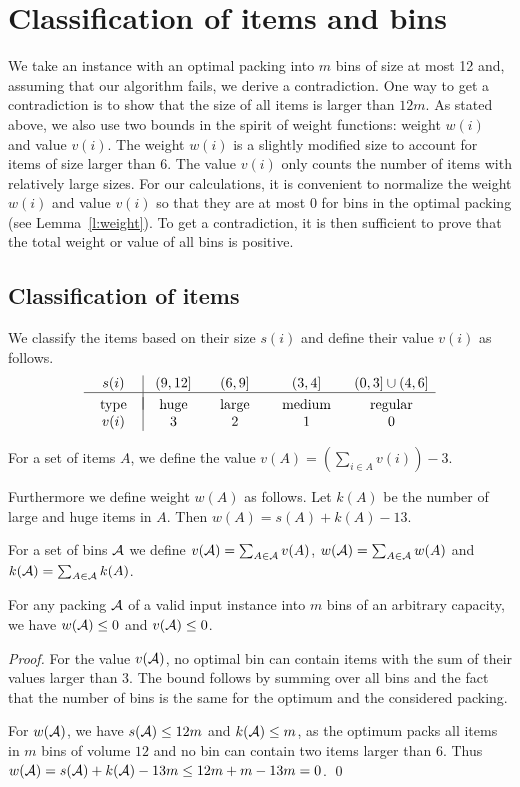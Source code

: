 \section{Classification of items and bins}

We take an instance with an optimal packing into $m$ bins of size at
most 12 and, assuming that our algorithm fails, we derive a
contradiction. One way to get a contradiction is to show that the size
of all items is larger than $12m$. As stated above, 
we also use two bounds in the
spirit of weight functions: weight $w(i)$ and value $v(i)$. The weight
$w(i)$ is a slightly modified size to account for items of size larger
than 6. The value $v(i)$ only counts the number of items with
relatively large sizes. For our calculations, it is convenient to
normalize the weight $w(i)$ and value $v(i)$ so that they are at most
0 for bins in the optimal packing (see Lemma~\ref{l:weight}). To get a contradiction, it is then sufficient to prove that
the total weight or value of all bins is positive.

\subsection{Classification of items}

We classify the items based on their size $s(i)$ and define their
value $v(i)$ as follows.  
$$
\begin{array}{c|cccc}
s(i) & (9,12] &(6,9] &(3,4] &(0,3]\cup(4,6]\\
\hline\\[-0.9em]
\mbox{~~type~~} & \mbox{~~huge~~} &\mbox{~~large~~} &\mbox{~~medium~~} &\mbox{~~regular~~}\\
v(i) & 3 & 2 & 1 & 0
\end{array}
$$

\begin{dfn}
For a set of items $A$, we define the value $v(A)=(\sum_{i\in
  A}v(i))-3$.

Furthermore we define weight $w(A)$ as follows. Let $k(A)$ be the
number of large and huge items in $A$. Then $w(A)=s(A)+k(A)-13$.

For a set of bins ${\mathcal A}$ we define $v({\mathcal A})=\sum_{A\in{\mathcal A}}v(A)$,
$w({\mathcal A})=\sum_{A\in{\mathcal A}}w(A)$ and $k({\mathcal A})=\sum_{A\in{\mathcal A}}k(A)$.
\end{dfn}

\begin{lem}
\label{l:weight}
For any packing ${\mathcal A}$ of a valid input instance into $m$ bins of an
arbitrary capacity,
we have $w({\mathcal A})\leq 0$ and $v({\mathcal A})\leq 0$.
\end{lem}
\begin{proof}
For the value $v({\mathcal A})$, no optimal bin can contain items
with the sum of their values larger than 3. The bound follows by
summing over all bins and the fact that the number of bins is the same
for the optimum and the considered packing. 

For $w({\mathcal A})$, we have $s({\mathcal A})\leq 12m$ and $k({\mathcal A})\leq m$, as the
optimum packs all items in $m$ bins of volume $12$ and no bin can
contain two items larger than $6$. Thus
$w({\mathcal A})=s({\mathcal A})+k({\mathcal A})-13m\leq 12m+m-13m=0$.
\qed
\end{proof}

